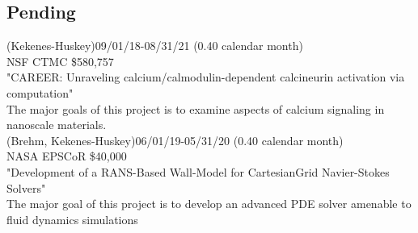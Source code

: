 \subsection{Pending}




(Kekenes-Huskey)\dapi \hfill 09/01/18-08/31/21 (0.40 calendar month)\\
NSF CTMC \hfill \$580,757\\
"CAREER: Unraveling calcium/calmodulin-dependent calcineurin activation via computation"\\
The major goals of this project is to examine aspects of calcium signaling in nanoscale materials. \\

(Brehm, Kekenes-Huskey)\dacopi \hfill 06/01/19-05/31/20 (0.40 calendar month)\\
NASA EPSCoR \hfill \$40,000\\
"Development of a RANS-Based Wall-Model for CartesianGrid Navier-Stokes Solvers"\\
The major goal of this project is to develop an advanced PDE solver amenable to fluid dynamics simulations  \\

